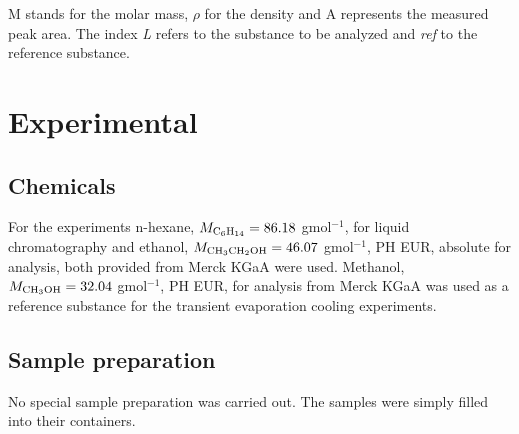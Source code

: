 \documentclass[a4paper,abstracton]{article}	                       %
\renewcommand{\cite}{\supercite}						%
\begin{document}
M stands for the molar mass, $\rho$ for the density and A represents the measured peak area. The index \textit{L} refers to the substance to be analyzed and \textit{ref} to the reference substance.
\clearpage

\section*{Experimental}
\subsection*{Chemicals}
For the experiments n-hexane, $ M_{\ce{C6H14}}= 86.18$ \si{\g}\si{\mol}$^{-1}$\cite{nhexane}, for liquid chromatography and ethanol, $ M_{\ce{CH3CH2OH }}= 46.07$ \si{\g}\si{\mol}$^{-1}$\cite{ethanol}, PH EUR, absolute for analysis, both provided from Merck KGaA were used. Methanol, $ M_{\ce{CH3OH}}= 32.04 $ \si{\g}\si{\mol}$^{-1}$\cite{methanol}, PH EUR, for analysis from Merck KGaA was used as a reference substance for the transient evaporation cooling experiments. 

\subsection*{Sample preparation}
No special sample preparation was carried out. The samples were simply filled into their containers. 
\end{document}
